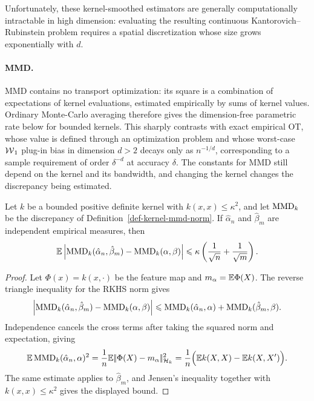 Unfortunately, these kernel-smoothed estimators are generally computationally intractable in high dimension: evaluating the resulting continuous Kantorovich--Rubinstein problem requires a spatial discretization whose size grows exponentially with \(d\).

\paragraph{MMD.}
MMD contains no transport optimization: its square is a combination of expectations of kernel evaluations, estimated empirically by sums of kernel values. Ordinary Monte-Carlo averaging therefore gives the dimension-free parametric rate below for bounded kernels. This sharply contrasts with exact empirical OT, whose value is defined through an optimization problem and whose worst-case \(\operatorname{\mathcal{W}}_1\) plug-in bias in dimension \(d>2\) decays only as \(n^{-1/d}\), corresponding to a sample requirement of order \(\delta^{-d}\) at accuracy \(\delta\). The constants for MMD still depend on the kernel and its bandwidth, and changing the kernel changes the discrepancy being estimated.

\begin{prop}\label{prop-mmd-sample-rate}
	Let $k$ be a bounded positive definite kernel with $k(x,x)\leq\kappa^2$, and let $\operatorname{MMD}_k$ be the discrepancy of Definition~\ref{def-kernel-mmd-norm}. If $\hat\alpha_n$ and $\hat\beta_m$ are independent empirical measures, then
	\[
		\EE\abs{\MMD_k(\hat\alpha_n,\hat\beta_m)-\MMD_k(\alpha,\beta)}
\index{maximum mean discrepancy}%
		\leq
		\kappa\left(\frac1{\sqrt n}+\frac1{\sqrt m}\right).
	\]
\end{prop}

\begin{proof}
	Let $\Phi(x)=k(x,\cdot)$ be the feature map and $m_\alpha=\mathbb{E}\Phi(X)$. The reverse triangle inequality for the RKHS norm gives
	\[
		\abs{\MMD_k(\hat\alpha_n,\hat\beta_m)-\MMD_k(\alpha,\beta)}
\index{maximum mean discrepancy}%
		\leq
		\MMD_k(\hat\alpha_n,\alpha)+\MMD_k(\hat\beta_m,\beta).
	\]
	Independence cancels the cross terms after taking the squared norm and expectation, giving
	\[
		\mathbb{E}\operatorname{MMD}_k(\hat\alpha_n,\alpha)^2
		=\frac1n\mathbb{E}|\!| \Phi(X)-m_\alpha |\!|_{\mathcal{H}_k}^2
		=\frac{1}{n}\Big(\mathbb{E} k(X,X)-\mathbb{E} k(X,X')\Big).
	\]
	The same estimate applies to $\hat\beta_m$, and Jensen's inequality together with $k(x,x)\leq\kappa^2$ gives the displayed bound.
\end{proof}

